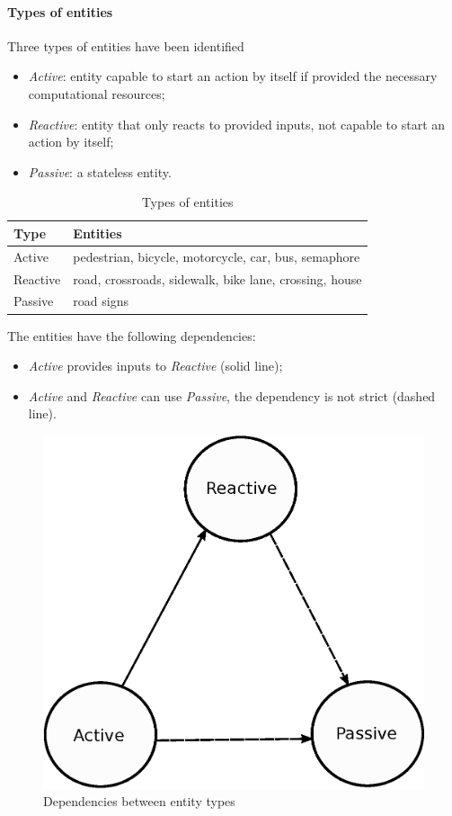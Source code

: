 \paragraph{Types of entities}
Three types of entities have been identified
\begin{itemize}
  \item \textit{Active}: entity capable to start an action by itself if provided 
the necessary computational resources;
  \item \textit{Reactive}: entity that only reacts to provided inputs, 
not capable to start an action by itself;
  \item \textit{Passive}: a stateless entity.
\end{itemize}
\begin{table}[H]
\centering
\begin{tabular}{|l|l|}
\hline
\rowcolor{BlueGreen}
Type     & Entities                                 \\ \hline
Active   & pedestrian, bicycle, motorcycle, car, bus, semaphore \\ \hline
Reactive & road, crossroads, sidewalk, bike lane, crossing, house \\ \hline
Passive  & road signs                               \\ \hline
\end{tabular}
\caption{Types of entities}
\label{tab:entity_type}
\end{table}
The entities have the following dependencies:
\begin{itemize}
  \item \textit{Active} provides inputs to \textit{Reactive} (solid line);
  \item \textit{Active} and \textit{Reactive} can use \textit{Passive}, the dependency is not strict (dashed line).
\end{itemize}
\begin{figure}[H]
  \centering
  \includegraphics[width=.35\columnwidth]{sections/images/solution/entity_type_dependency.eps}
  \caption{Dependencies between entity types}
  \label{fig:sd-entity-types-deps}
\end{figure}
